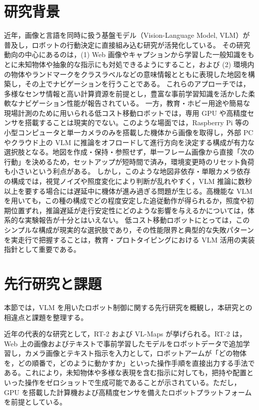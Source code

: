\documentclass[a4paper,11pt]{ltjsreport}
\begin{document}
\section{研究背景}
近年，画像と言語を同時に扱う基盤モデル（Vision-Language Model, VLM）が普及し，ロボットの行動決定に直接組み込む研究が活発化している。
その研究動向の中心にあるのは，(1) Web 画像やキャプションから学習した一般知識をもとに未知物体や抽象的な指示にも対処できるようにすること，および (2) 環境内の物体やランドマークをクラスラベルなどの意味情報とともに表現した地図を構築し，その上でナビゲーションを行うことである。
これらのアプローチでは，多様なセンサ情報と高い計算資源を前提とし，豊富な事前学習知識を活かした柔軟なナビゲーション性能が報告されている。
一方，教育・ホビー用途や簡易な現場計測のために用いられる低コスト移動ロボットでは，専用 GPU や高精度センサを搭載することは現実的でない。このような場面では，Raspberry Pi 等の小型コンピュータと単一カメラのみを搭載した機体から画像を取得し，外部 PC やクラウド上の VLM に推論をオフロードして進行方向を決定する構成が有力な選択肢となる。地図を作成・保持・参照せず，単一フレーム画像から直接「次の行動」を決めるため，セットアップが短時間で済み，環境変更時のリセット負荷も小さいという利点がある。
しかし，このような地図非依存・単眼カメラ依存の構成では，視覚ノイズや照度変化により判断が乱れやすく，VLM 推論に数秒以上を要する場合には遅延中に機体が進み過ぎる問題が生じる。高機能な VLM を用いても，この種の構成でどの程度安定した追従動作が得られるか，照度や初期位置ずれ，推論遅延が走行安定性にどのような影響を与えるかについては，体系的な実験報告が十分とはいえない。
低コスト移動ロボットにとっては，このシンプルな構成が現実的な選択肢であり，その性能限界と典型的な失敗パターンを実走行で把握することは，教育・プロトタイピングにおける VLM 活用の実装指針として重要である。

\section{先行研究と課題}
本節では，VLM を用いたロボット制御に関する先行研究を概観し，本研究との相違点と課題を整理する。

近年の代表的な研究として，RT-2\cite{rt2} および VL-Maps\cite{vlmaps} が挙げられる。RT-2 は，Web 上の画像およびテキストで事前学習したモデルをロボットデータで追加学習し，カメラ画像とテキスト指示を入力として，ロボットアームが「どの物体を，どの順番で，どのように動かすか」といった操作手順を直接出力する手法である。これにより，未知物体や多様な表現を含む指示に対しても，把持や配置といった操作をゼロショットで生成可能であることが示されている。ただし，GPU を搭載した計算機および高精度センサを備えたロボットプラットフォームを前提としている。
\end{document}
